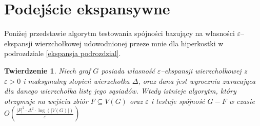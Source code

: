 \documentclass{pracamgr}
\newtheorem{theorem}{Twierdzenie}[chapter]
\begin{document}
  \section{Podejście ekspansywne}\label{podejscie ekspansywne}
   Poniżej przedstawie algorytm testowania spójności bazujący na własności $\varepsilon$--ekspansji wierzchołkowej
   udowodnionej przeze mnie dla hiperkostki w podrozdziale \ref{ekspansja podrozdzial}.
   \begin{theorem}\label{Spójność ekspansywna}
    Niech graf $G$ posiada własność $\varepsilon$--ekspansji wierzchołkowej z $\varepsilon>0$ i maksymalny stopień wierzchołka $\Delta$,
    oraz dana jest wyrocznia zwracająca dla danego wierzchołka listę jego sąsiadów.
    Wtedy istnieje algorytm, który otrzymuje na wejściu zbiór $F\subseteq V(G)$ oraz $\varepsilon$
    i testuje spójność $G-F$ w czasie $O\left(\frac{|F|^2\cdot\Delta^2\cdot\log(|V(G)|)}{\varepsilon}\right)$
   \end{theorem}
\end{document}

